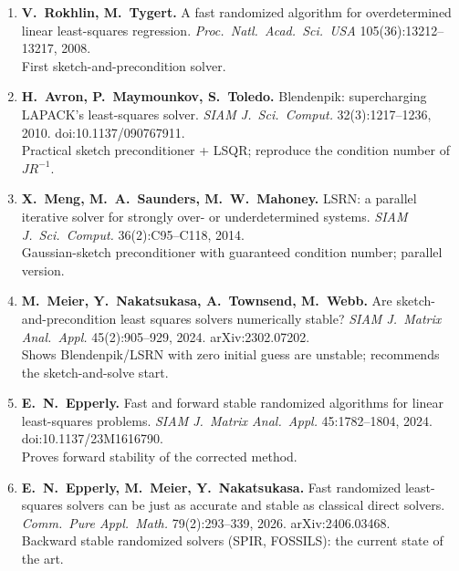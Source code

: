 \documentclass[11pt,a4paper]{article}
\begin{document}
\begin{enumerate}[resume]
\item \textbf{V.~Rokhlin, M.~Tygert.} A fast randomized algorithm for overdetermined linear least-squares regression. \emph{Proc.\ Natl.\ Acad.\ Sci.\ USA} 105(36):13212--13217, 2008.\\
First sketch-and-precondition solver.

\item \textbf{H.~Avron, P.~Maymounkov, S.~Toledo.} Blendenpik: supercharging LAPACK's least-squares solver. \emph{SIAM J.\ Sci.\ Comput.} 32(3):1217--1236, 2010. doi:10.1137/090767911.\\
Practical sketch preconditioner + LSQR; reproduce the condition number of $JR^{-1}$.

\item \textbf{X.~Meng, M.~A.~Saunders, M.~W.~Mahoney.} LSRN: a parallel iterative solver for strongly over- or underdetermined systems. \emph{SIAM J.\ Sci.\ Comput.} 36(2):C95--C118, 2014.\\
Gaussian-sketch preconditioner with guaranteed condition number; parallel version.

\item \textbf{M.~Meier, Y.~Nakatsukasa, A.~Townsend, M.~Webb.} Are sketch-and-precondition least squares solvers numerically stable? \emph{SIAM J.\ Matrix Anal.\ Appl.} 45(2):905--929, 2024. arXiv:2302.07202.\\
Shows Blendenpik/LSRN with zero initial guess are unstable; recommends the sketch-and-solve start.

\item \textbf{E.~N.~Epperly.} Fast and forward stable randomized algorithms for linear least-squares problems. \emph{SIAM J.\ Matrix Anal.\ Appl.} 45:1782--1804, 2024. doi:10.1137/23M1616790.\\
Proves forward stability of the corrected method.

\item \textbf{E.~N.~Epperly, M.~Meier, Y.~Nakatsukasa.} Fast randomized least-squares solvers can be just as accurate and stable as classical direct solvers. \emph{Comm.\ Pure Appl.\ Math.} 79(2):293--339, 2026. arXiv:2406.03468.\\
Backward stable randomized solvers (SPIR, FOSSILS): the current state of the art.
\end{enumerate}
\end{document}
